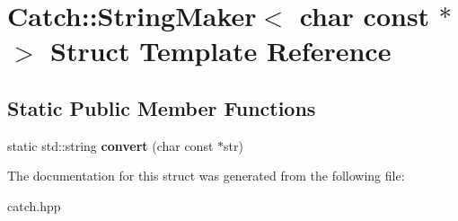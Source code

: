 \hypertarget{structCatch_1_1StringMaker_3_01char_01const_01_5_01_4}{}\section{Catch\+:\+:String\+Maker$<$ char const $\ast$ $>$ Struct Template Reference}
\label{structCatch_1_1StringMaker_3_01char_01const_01_5_01_4}
\subsection*{Static Public Member Functions}
\begin{DoxyCompactItemize}
\item 
static std\+::string {\bfseries convert} (char const $\ast$str)\hypertarget{structCatch_1_1StringMaker_3_01char_01const_01_5_01_4_a20813965ad59cdf6d1f874f47158432d}{}\label{structCatch_1_1StringMaker_3_01char_01const_01_5_01_4_a20813965ad59cdf6d1f874f47158432d}

\end{DoxyCompactItemize}


The documentation for this struct was generated from the following file\+:\begin{DoxyCompactItemize}
\item 
catch.\+hpp\end{DoxyCompactItemize}
